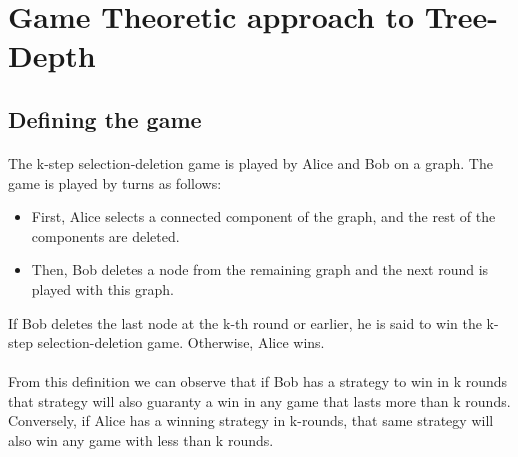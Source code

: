 \section{Game Theoretic approach to Tree-Depth}

\subsection{Defining the game}
\paragraph{}
The k-step selection-deletion game is played by Alice and Bob on a graph. The game is played by turns as follows:
\begin{itemize}
  \item First, Alice selects a connected component of the graph, and the rest of the components are deleted.
  \item Then, Bob deletes a node from the remaining graph and the next round is played with this graph.
\end{itemize}

If Bob deletes the last node at the k-th round or earlier, he is said to win the k-step selection-deletion game. Otherwise, Alice wins.
\paragraph{}
From this definition we can observe that if Bob has a strategy to win in k rounds that strategy will also guaranty a win in any game that lasts more than k rounds. Conversely, if Alice has a winning strategy in k-rounds, that same strategy will also win any game with less than k rounds.

